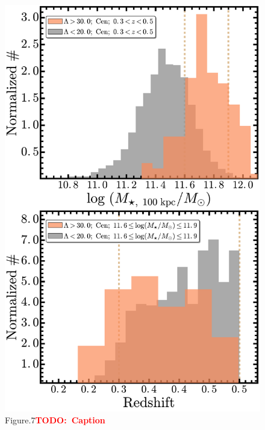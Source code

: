 \documentclass[preprint]{aastex}
\newcommand{\todo}[1]{\textcolor{red}{\textbf{TODO:~#1}}}
\begin{document}
\begin{CJK*}{UTF8}{gbsn}
\clearpage
{}
\begin{figure}
    \centering 
    \includegraphics[width=12.5cm]{fig/redbcg_mass_z_hist}
    \caption{Figure.7\todo{Caption}}\label{figure:7}
\end{figure}


\end{CJK*}
\end{document}
